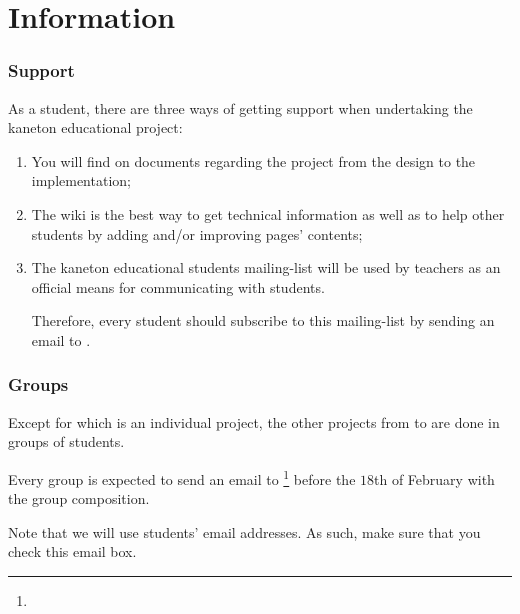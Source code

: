 %
%

\section{Information}


\begin{frame}
  \frametitle{Support}

  As a student, there are three ways of getting support when undertaking
  the kaneton educational project:

  \-

  \begin{enumerate}
    \item

      \-

      You will find on  documents regarding
      the project from the design to the implementation;
    \item

      \-

      The wiki  is the best way to get
      technical information as well as to help other students by adding
      and/or improving pages' contents;
    \item

      \-

      The kaneton educational students mailing-list
       will be used by teachers as
      an official means for communicating with students.

      \-

      Therefore, every student should subscribe to this mailing-list by sending
      an email to .
  \end{enumerate}
\end{frame}


\begin{frame}
  \frametitle{Groups}

  Except for  which is an individual project, the other projects
  from  to  are done in groups of  students.

  \-

  Every group is expected to send an email to
  \footnote{}
  before the $18$th of February with the group composition.

  \-

  Note that we will use students'  email addresses. As such,
  make sure that you check this email box.
\end{frame}

